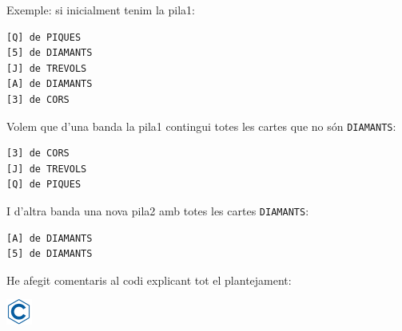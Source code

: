\documentclass[]{book}
\begin{document}
Exemple: si inicialment tenim la pila1:

\begin{verbatim}
[Q] de PIQUES
[5] de DIAMANTS
[J] de TREVOLS
[A] de DIAMANTS
[3] de CORS
\end{verbatim}

Volem que d'una banda la pila1 contingui totes les cartes que no són
\texttt{DIAMANTS}:

\begin{verbatim}
[3] de CORS
[J] de TREVOLS
[Q] de PIQUES
\end{verbatim}

I d'altra banda una nova pila2 amb totes les cartes \texttt{DIAMANTS}:

\begin{verbatim}
[A] de DIAMANTS
[5] de DIAMANTS
\end{verbatim}

He afegit comentaris al codi explicant tot el plantejament:

\includegraphics{./img/c.png}
\end{document}
